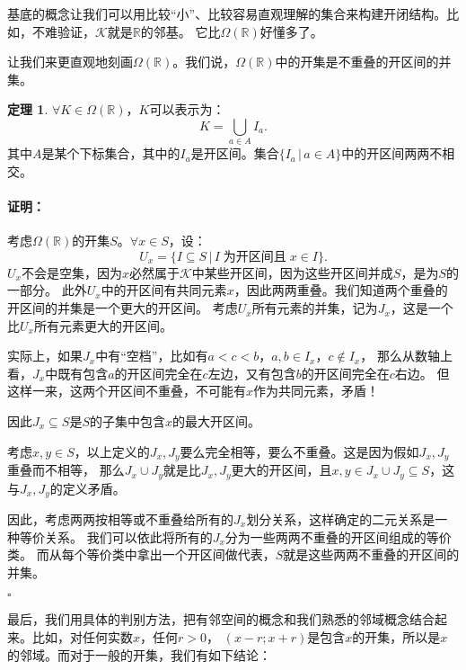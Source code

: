 \documentclass[12pt,UTF8]{ctexbook}
\theoremstyle{definition}
\newtheorem{tm}{定理}[section]
\theoremstyle{plain}
\renewenvironment{proof}{\paragraph{\textbf{证明：}}}{\hfill$\square$}
\begin{document}
\begin{appendix}
基底的概念让我们可以用比较“小”、比较容易直观理解的集合来构建开闭结构。比如，不难验证，$\mathcal{K}$就是$\mathbb{R}$的邻基。
它比$\Omega(\mathbb{R})$好懂多了。


让我们来更直观地刻画$\Omega(\mathbb{R})$。我们说，$\Omega(\mathbb{R})$中的开集是不重叠的开区间的并集。
\begin{tm}\label{tm:a-1-20}
    $\forall K \in \Omega(\mathbb{R})$，$K$可以表示为：
    $$ K = \bigcup_{a\in A} I_a. $$
    其中$A$是某个下标集合，其中的$I_a$是开区间。集合$\{I_a \, | \, a\in A\}$中的开区间两两不相交。
\end{tm}

\begin{proof}
    考虑$\Omega(\mathbb{R})$的开集$S$。$\forall x\in S$，设：
    $$ U_x = \{I\subseteq S \, | \, I\;\mbox{为开区间且}\;x\in I \}.$$
    $U_x$不会是空集，因为$x$必然属于$\mathcal{K}$中某些开区间，因为这些开区间并成$S$，是为$S$的一部分。
    此外$U_x$中的开区间有共同元素$x$，因此两两重叠。我们知道两个重叠的开区间的并集是一个更大的开区间。
    考虑$U_x$所有元素的并集，记为$J_x$，这是一个比$U_x$所有元素更大的开区间。
    
    实际上，如果$J_x$中有“空档”，比如有$a<c<b$，$a, b\in I_x$，$c\notin I_x$，
    那么从数轴上看，$J_x$中既有包含$a$的开区间完全在$c$左边，又有包含$b$的开区间完全在$c$右边。
    但这样一来，这两个开区间不重叠，不可能有$x$作为共同元素，矛盾！
    
    因此$J_x\subseteq S$是$S$的子集中包含$x$的最大开区间。

    考虑$x,y\in S$，以上定义的$J_x, J_y$要么完全相等，要么不重叠。这是因为假如$J_x, J_y$重叠而不相等，
    那么$J_x\cup J_y$就是比$J_x, J_y$更大的开区间，且$x,y\in J_x\cup J_y\subseteq S$，这与$J_x, J_y$的定义矛盾。

    因此，考虑两两按相等或不重叠给所有的$J_x$划分关系，这样确定的二元关系是一种等价关系。
    我们可以依此将所有的$J_x$分为一些两两不重叠的开区间组成的等价类。
    而从每个等价类中拿出一个开区间做代表，$S$就是这些两两不重叠的开区间的并集。

\end{proof}

最后，我们用具体的判别方法，把有邻空间的概念和我们熟悉的邻域概念结合起来。比如，对任何实数$x$，任何$r>0$，
$(x-r;x+r)$是包含$x$的开集，所以是$x$的邻域。而对于一般的开集，我们有如下结论：


\end{appendix}
\end{document}
